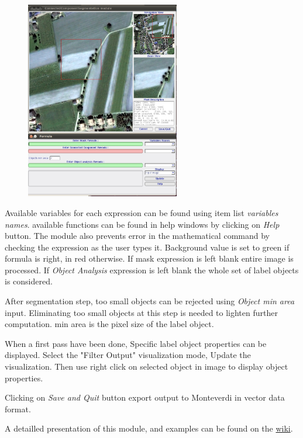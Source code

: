 \begin{figure}
  \center
  \includegraphics[width=0.6\textwidth]{../Art/MonteverdiImages/monteverdi_connected_component_segmentation.png}
  \label{fig:connected_component_module}
\end{figure}

Available variables for each expression can be found using item list \emph{variables names}. available functions can  be found in help windows by clicking on \emph{Help} button. The module also prevents error in the mathematical command by checking the expression as the user types it. Background value is set to green if formula is right, in red otherwise. If mask expression is left blank entire image is processed. If \emph{Object Analysis} expression is left blank the whole set of label objects is considered.

After segmentation step, too small objects can be rejected using \emph{Object min area} input. Eliminating too small objects at this step is needed to lighten further computation. min area is the pixel size of the label object. 

When a first pass have been done, Specific label object properties can be displayed. Select the "Filter Output" visualization mode, Update the visualization. Then use right click on selected object in image to display object properties.

Clicking on \emph{Save and Quit} button export output to Monteverdi in vector data format.
 
A detailled presentation of this module, and examples can be found on the \href{http://wiki.orfeo-toolbox.org/index.php/Connected_component_segmentation_module}{wiki}.

